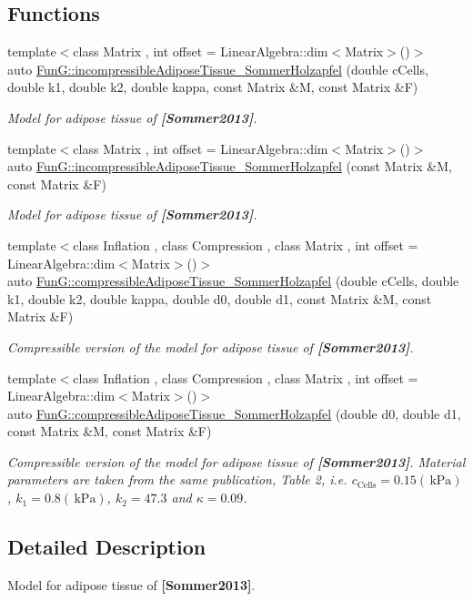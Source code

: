 \subsection*{Functions}
\begin{DoxyCompactItemize}
\item 
{\footnotesize template$<$class Matrix , int offset = Linear\+Algebra\+::dim$<$\+Matrix$>$()$>$ }\\auto \hyperlink{group__Biomechanics_gac269eefc1abb994044e1634c20a98061}{Fun\+G\+::incompressible\+Adipose\+Tissue\+\_\+\+Sommer\+Holzapfel} (double c\+Cells, double k1, double k2, double kappa, const Matrix \&M, const Matrix \&F)
\begin{DoxyCompactList}\small\item\em Model for adipose tissue of {\bfseries [Sommer2013]}. \end{DoxyCompactList}\item 
{\footnotesize template$<$class Matrix , int offset = Linear\+Algebra\+::dim$<$\+Matrix$>$()$>$ }\\auto \hyperlink{group__Biomechanics_ga01ab128bcf179f4431b0270179af9e20}{Fun\+G\+::incompressible\+Adipose\+Tissue\+\_\+\+Sommer\+Holzapfel} (const Matrix \&M, const Matrix \&F)
\begin{DoxyCompactList}\small\item\em Model for adipose tissue of {\bfseries [Sommer2013]}. \end{DoxyCompactList}\item 
{\footnotesize template$<$class Inflation , class Compression , class Matrix , int offset = Linear\+Algebra\+::dim$<$\+Matrix$>$()$>$ }\\auto \hyperlink{group__Biomechanics_ga5c3388564c0420b62e58f48c739d27f1}{Fun\+G\+::compressible\+Adipose\+Tissue\+\_\+\+Sommer\+Holzapfel} (double c\+Cells, double k1, double k2, double kappa, double d0, double d1, const Matrix \&M, const Matrix \&F)
\begin{DoxyCompactList}\small\item\em Compressible version of the model for adipose tissue of {\bfseries [Sommer2013]}. \end{DoxyCompactList}\item 
{\footnotesize template$<$class Inflation , class Compression , class Matrix , int offset = Linear\+Algebra\+::dim$<$\+Matrix$>$()$>$ }\\auto \hyperlink{group__Biomechanics_ga27bb3f7c579ce8c21a69ea4d4d0169d7}{Fun\+G\+::compressible\+Adipose\+Tissue\+\_\+\+Sommer\+Holzapfel} (double d0, double d1, const Matrix \&M, const Matrix \&F)
\begin{DoxyCompactList}\small\item\em Compressible version of the model for adipose tissue of {\bfseries [Sommer2013]}. Material parameters are taken from the same publication, Table 2, i.\+e. $c_\mathrm{Cells}=0.15 (\,\mathrm{kPa})$, $k_1=0.8 (\,\mathrm{kPa})$, $k_2=47.3$ and $\kappa=0.09$. \end{DoxyCompactList}\end{DoxyCompactItemize}


\subsection{Detailed Description}
Model for adipose tissue of {\bfseries [Sommer2013]}. 

